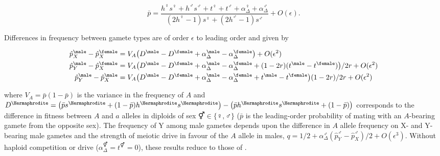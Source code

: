 \documentclass[12pt]{article}
\begin{document}
\begin{equation}
\bar{p}=\frac{h^\female s^\female + h^\male s^\male +t^\female+t^\male+\alpha_{\Delta}^\female+\alpha_{\Delta}^\male}
{(2h^\female-1)s^\female+(2h^\male-1)s^\male}
+O(\epsilon)
.
\label{eq:pAve}
\end{equation}

\noindent
Differences in frequency between gamete types are of order $\epsilon$ to leading order and given by

\begin{equation}
\begin{split}
\hat{p}^\male_X-\hat{p}^\female_X&=V_{A}\big{(}D^\male - D^\female +\alpha_{\Delta}^\male-\alpha_{\Delta}^\female \big{)}
+O(\epsilon^2)\\
%
\hat{p}^\male_Y-\hat{p}^\female_X&=V_{A}\big{(}D^\male - D^\female+\alpha_{\Delta}^\male-\alpha_{\Delta}^\female+(1-2r)(t^\male-t^\female)\big{)}/2r
+O(\epsilon^2)\\
%
\hat{p}^\male_Y-\hat{p}^\male_X&=V_{A}\big{(}D^\male - D^\female+\alpha_{\Delta}^\male-\alpha_{\Delta}^\female+t^\male-t^\female\big{)}(1-2r)/2r
+O(\epsilon^2)
\end{split}
\label{eq:freq_diffs}
\end{equation}

\noindent
where $V_{A}=\bar{p}(1-\bar{p})$ is the variance in the frequency of $A$ and $D^\Hermaphrodite=\big{(} \bar{p}s^\Hermaphrodite+(1-\bar{p})h^\Hermaphrodite s^\Hermaphrodite\big{)} -\big{(} \bar{p}h^\Hermaphrodite s^\Hermaphrodite+(1-\bar{p}) \big{)}$ corresponds to the difference in fitness between $A$ and $a$ alleles in diploids of sex $\Hermaphrodite \in \{\female,\male\}$ ($\bar{p}$ is the leading-order probability of mating with an $A$-bearing gamete from the opposite sex). 
The frequency of Y among male gametes depends upon the difference in $A$ allele frequency on X- and Y-bearing male gametes and the strength of meiotic drive in favour of the $A$ allele in males, $q=1/2+\alpha_{\Delta}^\male(\hat{p}^\male_Y-\hat{p}^\male_X)/2+O(\epsilon^3)$.
Without haploid competition or drive ($\alpha_{\Delta}^\Hermaphrodite=t^\Hermaphrodite=0$), these results reduce to those of \citet{vanDoorn:2007eu}.


\end{document}
